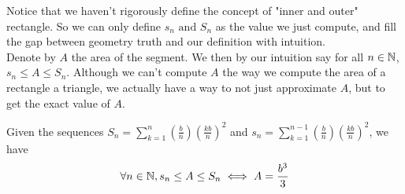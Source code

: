 \documentclass{report}
\begin{document}
Notice that we haven't rigorously define the concept of "inner and outer" rectangle. So we can only define $s_n\text{ and }S_n$ as the value we just compute, and fill the gap between geometry truth and our definition with intuition.\\

Denote by $A$ the area of the segment. We then by our intuition say for all $n\in \mathbb{N}$, $s_n\leq A\leq S_n$. Although we can't compute $A$ the way we compute the area of a rectangle a triangle, we actually have a way to not just approximate  $A$, but to get the exact value of  $A$.
\begin{theorem} 
Given the sequences $S_n=\sum_{k=1}^{n}(\frac{b}{n})(\frac{kb}{n})^2$ and $s_n=\sum_{k=1}^{n-1}(\frac{b}{n})(\frac{kb}{n})^2$, we have
\begin{equation}
\forall n\in\mathbb{N}, s_n\leq A\leq S_n\iff A=\frac{b^3}{3}
\end{equation}
\end{theorem}
\end{document}
